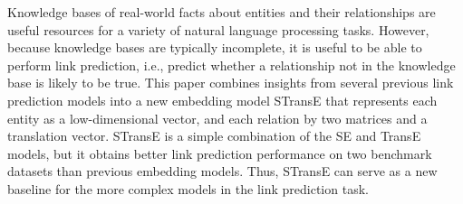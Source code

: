 Knowledge bases of real-world facts about entities and their relationships are useful resources for a variety of natural language processing tasks. However, because knowledge bases are typically incomplete, it is useful to be able to perform link prediction, i.e., predict whether a relationship not in the knowledge base is likely to be true. This paper combines insights from several previous link prediction models into a new embedding model STransE that represents each entity as a low-dimensional vector, and each relation by two matrices and a translation vector. STransE is a simple combination of the SE and TransE models, but it obtains better link prediction performance on two benchmark datasets than previous embedding models. Thus, STransE can serve as a new baseline for the more complex models in the link prediction task.

